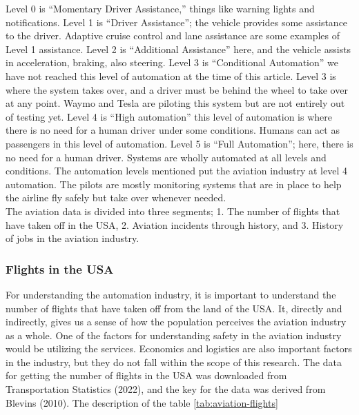 \documentclass[
  man,floatsintext]{apa7}
\begin{document}
Level 0 is ``Momentary Driver Assistance,'' things like warning lights and notifications. Level 1 is ``Driver Assistance''; the vehicle provides some assistance to the driver. Adaptive cruise control and lane assistance are some examples of Level 1 assistance. Level 2 is ``Additional Assistance'' here, and the vehicle assists in acceleration, braking, also steering. Level 3 is ``Conditional Automation'' we have not reached this level of automation at the time of this article. Level 3 is where the system takes over, and a driver must be behind the wheel to take over at any point. Waymo and Tesla are piloting this system but are not entirely out of testing yet. Level 4 is ``High automation'' this level of automation is where there is no need for a human driver under some conditions. Humans can act as passengers in this level of automation. Level 5 is ``Full Automation''; here, there is no need for a human driver. Systems are wholly automated at all levels and conditions. The automation levels mentioned put the aviation industry at level 4 automation. The pilots are mostly monitoring systems that are in place to help the airline fly safely but take over whenever needed.\\

The aviation data is divided into three segments; 1. The number of flights that have taken off in the USA, 2. Aviation incidents through history, and 3. History of jobs in the aviation industry.\\

\hypertarget{flights-in-the-usa}{%
\subsubsection{Flights in the USA}\label{flights-in-the-usa}}

For understanding the automation industry, it is important to understand the number of flights that have taken off from the land of the USA. It, directly and indirectly, gives us a sense of how the population perceives the aviation industry as a whole. One of the factors for understanding safety in the aviation industry would be utilizing the services. Economics and logistics are also important factors in the industry, but they do not fall within the scope of this research. The data for getting the number of flights in the USA was downloaded from Transportation Statistics (2022), and the key for the data was derived from Blevins (2010). The description of the table \ref{tab:aviation-flights}\\
\end{document}
